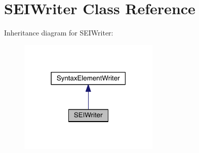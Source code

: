 \hypertarget{class_s_e_i_writer}{}\section{S\+E\+I\+Writer Class Reference}
\label{class_s_e_i_writer}


Inheritance diagram for S\+E\+I\+Writer\+:
\nopagebreak
\begin{figure}[H]
\begin{center}
\leavevmode
\includegraphics[width=190pt]{dd/d38/class_s_e_i_writer__inherit__graph}
\end{center}
\end{figure}


